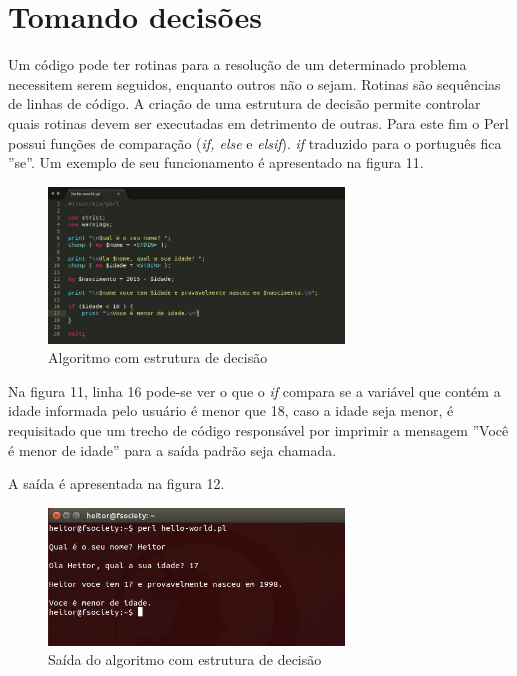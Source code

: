 \chapter{Tomando decis\~oes}

Um c\'odigo pode ter rotinas para a resolu\c{c}\~ao de um determinado problema necessitem serem seguidos, enquanto outros n\~ao o sejam. 
Rotinas s\~ao sequ\^encias de linhas de c\'odigo. A cria\c{c}\~ao de uma estrutura de decis\~ao permite controlar quais rotinas devem ser executadas em 
detrimento de outras. Para este fim o Perl possui fun\c{c}\~oes de compara\c{c}\~ao (\textit{if, else} e \textit{elsif}). \textit{if} traduzido para o 
portugu\^es fica ''se''. Um exemplo de seu funcionamento \'e apresentado na figura 11.   

\begin{figure}[!htb]
	\centering
	\includegraphics[width=0.7\textwidth]{../5_figuras/image11}
	\caption{Algoritmo com estrutura de decis\~ao}
\end{figure}

Na figura 11, linha 16 pode-se ver o que o \textit{if} compara se a vari\'avel que cont\'em a idade informada pelo usu\'ario \'e menor que 18, caso a idade 
seja menor, \'e requisitado que um trecho de c\'odigo respons\'avel por imprimir a mensagem ''Voc\^e \'e menor de idade'' para a sa\'ida padr\~ao seja chamada.

A sa\'ida \'e apresentada na figura 12.

\begin{figure}[!htb]
	\centering
	\includegraphics[width=0.7\textwidth]{../5_figuras/image12}
	\caption{Sa\'ida do algoritmo com estrutura de decis\~ao}
\end{figure}

